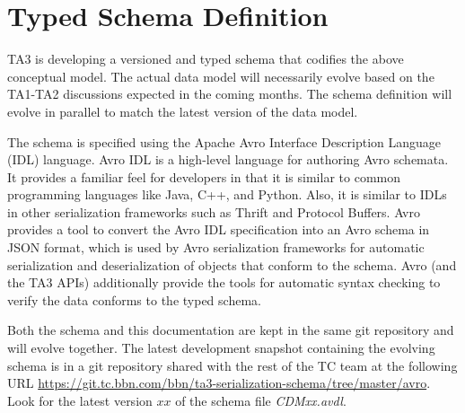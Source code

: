 \section{Typed Schema Definition}\label{sec:syntax}

TA3 is developing a versioned and typed schema that codifies the above
conceptual model. The actual data model will necessarily evolve based
on the TA1-TA2 discussions expected in the coming months.  The schema
definition will evolve in parallel to match the latest version of the
data model.

The schema is specified using the Apache Avro Interface Description
Language (IDL) language. Avro IDL is a high-level language for
authoring Avro schemata. It provides a familiar feel for developers in
that it is similar to common programming languages like Java, C++, and
Python. Also, it is similar to IDLs in other serialization
frameworks such as Thrift and Protocol Buffers. Avro provides a tool
to convert the Avro IDL specification into an Avro schema in JSON
format, which is used by Avro serialization frameworks for automatic
serialization and deserialization of objects that conform to the schema.
Avro (and the TA3 APIs) additionally provide the tools for automatic 
syntax checking to verify the data conforms to the typed schema.

Both the schema and this documentation are kept in the same git repository 
and will evolve together. The latest development snapshot containing the evolving schema is
in a git repository shared with the rest of the TC team at the following URL 
\href{https://git.tc.bbn.com/bbn/ta3-serialization-schema/tree/master/avro}{https://git.tc.bbn.com/bbn/ta3-serialization-schema/tree/master/avro}. 
Look for the latest version $xx$ of the schema file {\em CDMxx.avdl}.
